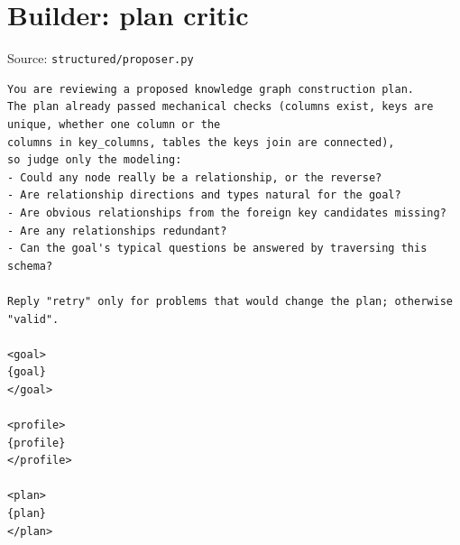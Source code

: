 \section*{Builder: plan critic}
\noindent Source: \texttt{structured/proposer.py}
\begin{lstlisting}
You are reviewing a proposed knowledge graph construction plan.
The plan already passed mechanical checks (columns exist, keys are unique, whether one column or the
columns in key_columns, tables the keys join are connected),
so judge only the modeling:
- Could any node really be a relationship, or the reverse?
- Are relationship directions and types natural for the goal?
- Are obvious relationships from the foreign key candidates missing?
- Are any relationships redundant?
- Can the goal's typical questions be answered by traversing this schema?

Reply "retry" only for problems that would change the plan; otherwise "valid".

<goal>
{goal}
</goal>

<profile>
{profile}
</profile>

<plan>
{plan}
</plan>
\end{lstlisting}

